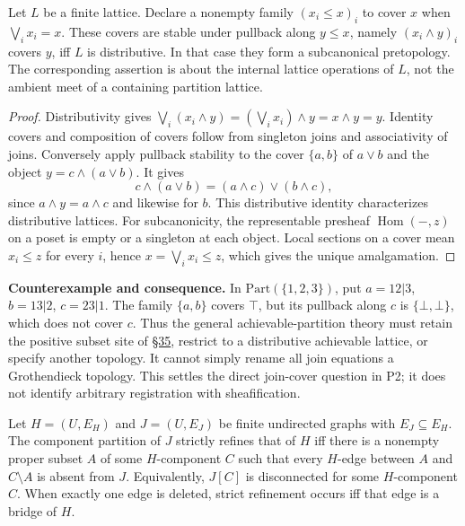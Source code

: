 
\begin{thmplain}

Let \(L\) be a finite lattice. Declare a nonempty family \((x_i\le x)_i\) to cover \(x\) when \(\bigvee_i x_i=x\). These covers are stable under pullback along \(y\le x\), namely \((x_i\wedge y)_i\) covers \(y\), iff \(L\) is distributive. In that case they form a subcanonical pretopology. The corresponding assertion is about the internal lattice operations of \(L\), not the ambient meet of a containing partition lattice.
\end{thmplain}

\begin{proof}

Distributivity gives \(\bigvee_i(x_i\wedge y)=(\bigvee_i x_i)\wedge y=x\wedge y=y\). Identity covers and composition of covers follow from singleton joins and associativity of joins. Conversely apply pullback stability to the cover \(\{a,b\}\) of \(a\vee b\) and the object \(y=c\wedge(a\vee b)\). It gives
\[c\wedge(a\vee b)=(a\wedge c)\vee(b\wedge c),\]
since \(a\wedge y=a\wedge c\) and likewise for \(b\). This distributive identity characterizes distributive lattices. For subcanonicity, the representable presheaf \(\operatorname{Hom}(-,z)\) on a poset is empty or a singleton at each object. Local sections on a cover mean \(x_i\le z\) for every \(i\), hence \(x=\bigvee_i x_i\le z\), which gives the unique amalgamation.
\end{proof}

\textbf{Counterexample and consequence.} In \(\mathrm{Part}(\{1,2,3\})\), put \(a=12|3\), \(b=13|2\), \(c=23|1\). The family \(\{a,b\}\) covers \(\top\), but its pullback along \(c\) is \(\{\bot,\bot\}\), which does not cover \(c\). Thus the general achievable-partition theory must retain the positive subset site of \hyperlink{sec:35}{§35}, restrict to a distributive achievable lattice, or specify another topology. It cannot simply rename all join equations a Grothendieck topology. This settles the direct join-cover question in P2; it does not identify arbitrary registration with sheafification.


\begin{thmplain}

Let \(H=(U,E_H)\) and \(J=(U,E_J)\) be finite undirected graphs with \(E_J\subseteq E_H\). The component partition of \(J\) strictly refines that of \(H\) iff there is a nonempty proper subset \(A\) of some \(H\)-component \(C\) such that every \(H\)-edge between \(A\) and \(C\setminus A\) is absent from \(J\). Equivalently, \(J[C]\) is disconnected for some \(H\)-component \(C\). When exactly one edge is deleted, strict refinement occurs iff that edge is a bridge of \(H\).
\end{thmplain}

